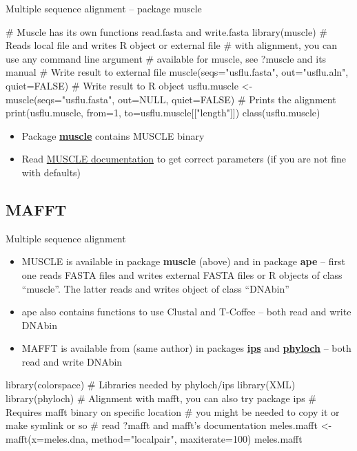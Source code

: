 \documentclass[compress, ucs, xelatex, 11pt, xcolor=svgnames,
  hyperref={
    bookmarks=true,
    unicode=true,
    colorlinks=true,
    pdftitle={Molecular data in R},
    plainpages=false,
    pdfauthor={Vojtech Zeisek},
    pdfsubject={Course about phylogeny and evolution in R},
    pdfcreator={XeLaTeX},
    pdfkeywords={R, evolution, phylogeny, molecular data},
    linkcolor=Tomato,
    anchorcolor=SaddleBrown,
    citecolor=Goldenrod,
    filecolor=DarkMagenta,
    menucolor=Sienna,
    urlcolor=DarkTurquoise,
    pdftex},
  url={hyphens, lowtilde} %
  ]{beamer}
\begin{document}
\begin{frame}[fragile]{Multiple sequence alignment -- package muscle}
  \begin{spluscode}
    # Muscle has its own functions read.fasta and write.fasta
    library(muscle)
    # Reads local file and writes R object or external file
    # with alignment, you can use any command line argument
    # available for muscle, see ?muscle and its manual
    # Write result to external file
    muscle(seqs="usflu.fasta", out="usflu.aln", quiet=FALSE)
    # Write result to R object
    usflu.muscle <- muscle(seqs="usflu.fasta", out=NULL, quiet=FALSE)
    # Prints the alignment
    print(usflu.muscle, from=1, to=usflu.muscle[["length"]])
    class(usflu.muscle)
  \end{spluscode}
\begin{itemize}
 \item Package \href{https://www.bioconductor.org/packages/release/bioc/html/muscle.html}{\textbf{muscle}} contains MUSCLE binary
 \item Read \href{http://www.drive5.com/muscle/manual/}{MUSCLE documentation} to get correct parameters (if you are not fine with defaults)
\end{itemize}
\end{frame}

\subsection{MAFFT}

\begin{frame}[fragile]{Multiple sequence alignment}
\begin{itemize}
 \item MUSCLE is available in package \textbf{muscle} (above) and in package \textbf{ape} -- first one reads FASTA files and writes external FASTA files or R objects of class ``muscle''. The latter reads and writes object of class ``DNAbin''
 \item ape also contains functions to use Clustal and T-Coffee -- both read and write DNAbin
 \item MAFFT is available from (same author) in packages \href{https://cran.r-project.org/web/packages/ips/index.html}{\textbf{ips}} and \href{http://www.christophheibl.de/Rpackages.html}{\textbf{phyloch}} -- both read and write DNAbin
\end{itemize}
  \begin{spluscode}
    library(colorspace) # Libraries needed by phyloch/ips
    library(XML)
    library(phyloch) # Alignment with mafft, you can also try package ips
    # Requires mafft binary on specific location
    # you might be needed to copy it or make symlink or so
    # read ?mafft and mafft's documentation
    meles.mafft <- mafft(x=meles.dna, method="localpair", maxiterate=100)
    meles.mafft
  \end{spluscode}
\end{frame}
\end{document}
